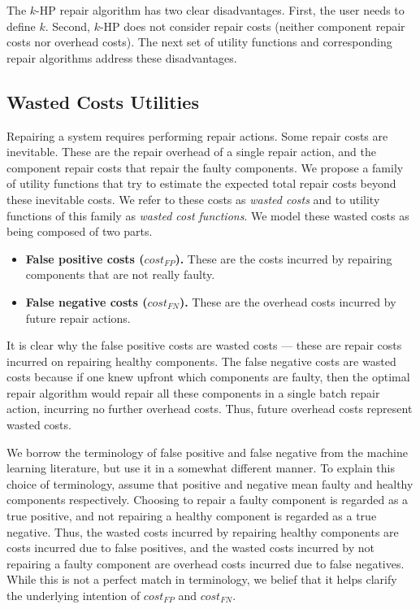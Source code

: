 \documentclass[review]{elsarticle}
\begin{document}
The $k$-HP repair algorithm has two clear disadvantages. First, the user needs to define $k$. Second, $k$-HP does not consider repair costs (neither component repair costs nor overhead costs).
The next set of utility functions and corresponding repair algorithms address these disadvantages.



\subsection{Wasted Costs Utilities}

Repairing a system requires performing repair actions. %
Some repair costs are inevitable. These are the repair overhead of a single repair action, and the component repair costs that repair the faulty components. We propose a family of utility functions that try to estimate the expected total repair costs beyond these inevitable costs. We refer to these costs as {\em wasted costs} and to utility functions of this family as {\em wasted cost functions}. We model these wasted costs as being composed of two parts.
\begin{itemize}
\item {\bf False positive costs ($cost_{FP}$).} These are the costs incurred by repairing components that are not really faulty.
\item {\bf False negative costs ($cost_{FN}$).} These are the overhead costs incurred by future repair actions.
\end{itemize}
It is clear why the false positive costs are wasted costs --- these are repair costs incurred on repairing healthy components. The false negative costs are wasted costs because if one knew upfront which components are faulty, then the optimal repair algorithm would repair all these components in a single batch repair action, incurring no further overhead costs. Thus, future overhead costs represent wasted costs.


We borrow the terminology of false positive and false negative from the machine learning literature, but use it in a somewhat different manner. To explain this choice of terminology, assume that positive and negative mean faulty and healthy components respectively. Choosing to repair a faulty component is regarded as a true positive, and not repairing a healthy component is regarded as a true negative. Thus, the wasted costs incurred by repairing healthy components are costs incurred due to false positives, and the wasted costs incurred by not repairing a faulty component are overhead costs incurred due to false negatives. While this is not a perfect match in terminology, we belief that it helps clarify the underlying intention of $cost_{FP}$ and $cost_{FN}$.
\end{document}
